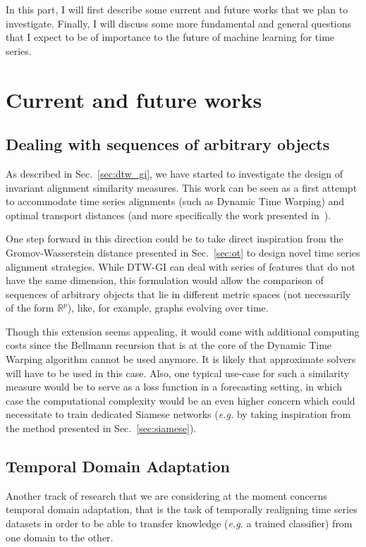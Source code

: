 In this part, I will first describe some current and future works that we plan
to investigate.
Finally, I will discuss some more fundamental and general questions that
I expect to be of importance to the future of machine learning for time series.

\section{Current and future works}

\subsection{Dealing with sequences of arbitrary objects}

As described in Sec.~\ref{sec:dtw_gi}, we have started to investigate
the design of invariant alignment similarity measures.
This work can be seen as a first attempt to accommodate time series alignments
(such as Dynamic Time Warping) and optimal transport distances
(and more specifically the work presented in~\cite{alvarez2018towards}).

One step forward in this direction could be to take direct inspiration from
the Gromov-Wasserstein distance presented in Sec.~\ref{sec:ot} to design
novel time series alignment strategies.
While DTW-GI can deal with series of features that do not have the
same dimension, this formulation would allow the comparison of
sequences of arbitrary objects that lie in different metric spaces (not
necessarily of the form $\mathbb{R}^p$), like, for example, graphs evolving
over time.

Though this extension seems appealing, it would come with additional
computing costs since the Bellmann recursion that is at the core of the Dynamic
Time Warping algorithm cannot be used anymore.
It is likely that approximate solvers will have to be used in this case.
Also, one typical use-case for such a similarity measure would be to serve as
a loss function in a forecasting setting, in which case the
computational complexity would be an even higher concern which could necessitate
to train dedicated Siamese networks (\emph{e.g.} by taking inspiration from the
method presented in
Sec.~\ref{sec:siamese}).

\subsection{Temporal Domain Adaptation}

Another track of research that we are considering at the moment concerns
temporal domain adaptation, that is the task of temporally realigning time
series datasets in order to be able to transfer knowledge (\emph{e.g.} a trained
classifier) from one domain to the other.

